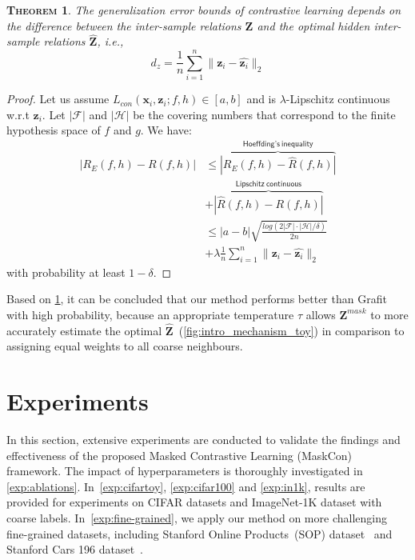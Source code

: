 \documentclass[10pt,twocolumn,letterpaper]{article}
\def\vx{{\bm{x}}}
\def\vz{{\bm{z}}}
\def\mZ{{\bm{Z}}}
\newtheorem{theorem}{\textsc{Theorem}}
\begin{document}
\begin{theorem}\label{theorem1}
The generalization error bounds of contrastive learning depends on the difference between the inter-sample relations $\mZ$ and the optimal hidden inter-sample relations $\hat{\mZ}$, i.e.,
\begin{equation}
\label{eq:zdiff}
    d_z = \frac{1}{n}\sum_{i=1}^n \lVert \vz_i - \hat{\vz_i} \rVert_2
\end{equation}
\end{theorem}
\begin{proof}
Let us assume $L_{con}(\vx_i, \vz_i; f, h) \in [a, b]$ and is $\lambda$-Lipschitz continuous w.r.t $\vz_i$. Let $|\mathcal{F}|$ and $|\mathcal{H}|$ be the covering numbers that correspond to the finite hypothesis space of $f$ and $g$.
We have:
\begin{align*}
    |R_E(f, h) - R(f, h)| &\leq  \overbrace{|R_E(f, h) - \hat{R}(f, h)|}^{\mathsf{Hoeffding’s \ inequality}} \\
    &+  \overbrace{|\hat{R}(f, h) - R(f, h)|}^{\mathsf{Lipschitz \ continuous}} \\
    &\leq |a-b|\sqrt{\frac{log(2|\mathcal{F}|\cdot|\mathcal{H}|/\delta)}{2n}} \\
    &+ \lambda \frac{1}{n}\sum_{i=1}^n \lVert \vz_i - \hat{\vz_i} \rVert_2
\end{align*}
with probability at least $1-\delta$.
\end{proof}

Based on \cref{theorem1}, it can be concluded that our method performs better than Grafit with high probability, because an appropriate temperature $\tau$ allows $\mZ^{mask}$ to more accurately estimate the optimal $\hat{\mZ}$~(\cref{fig:intro_mechanism_toy}) in comparison to assigning equal weights to all coarse neighbours.

\section{Experiments}
In this section, extensive experiments are conducted to validate the findings and effectiveness of the proposed Masked Contrastive Learning (MaskCon) framework. The impact of hyperparameters is thoroughly investigated in \cref{exp:ablations}.
In~\cref{exp:cifartoy}, \cref{exp:cifar100} and \cref{exp:in1k}, results are provided for experiments on CIFAR datasets and ImageNet-1K dataset with coarse labels. In~\cref{exp:fine-grained}, we apply our method on more challenging fine-grained datasets, including Stanford Online Products~(SOP) dataset~\cite{sopdataset} and Stanford Cars 196 dataset~\cite{cars196}. 
\end{document}
